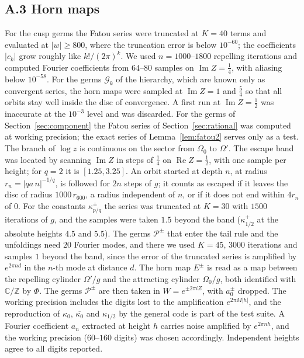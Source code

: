 \documentclass[11pt]{amsart}
\theoremstyle{definition}
\theoremstyle{remark}
\newcommand{\C}{\mathbb{C}}
\newcommand{\Z}{\mathbb{Z}}
\newcommand{\cG}{\mathcal{G}}
\begin{document}
\subsection*{A.3 Horn maps}
For the cusp germs the Fatou series were truncated at $K=40$ terms and evaluated at $|w|\ge800$, where the truncation error is below $10^{-60}$; the coefficients $|c_k|$ grow roughly like $k!/(2\pi)^k$. We used $n=1000$--$1800$ repelling iterations and computed Fourier coefficients from $64$--$80$ samples on $\operatorname{Im}Z=\frac14$, with aliasing below $10^{-58}$. For the germs $\cG_k$ of the hierarchy, which are known only as convergent series, the horn maps were sampled at $\operatorname{Im}Z=1$ and $\frac54$ so that all orbits stay well inside the disc of convergence. A first run at $\operatorname{Im}Z=\frac12$ was inaccurate at the $10^{-3}$ level and was discarded. For the germs of Section~\ref{sec:component} the Fatou series of Section~\ref{sec:rational} was computed at working precision; the exact series of Lemma~\ref{lem:fatou2} serves only as a test. The branch of $\log z$ is continuous on the sector from $\Omega_0$ to $\Omega'$. The escape band was located by scanning $\operatorname{Im}Z$ in steps of $\frac14$ on $\operatorname{Re}Z=\frac12$, with one sample per height; for $q=2$ it is $[1.25,3.25]$. An orbit started at depth $n$, at radius $r_n=|qa\,n|^{-1/q}$, is followed for $2n$ steps of $g$; it counts as escaped if it leaves the disc of radius $1000\,r_{600}$, a radius independent of $n$, or if it does not end within $4r_n$ of $0$. For the constants $\kappa^\pm_{p/q}$ the series was truncated at $K=30$ with $1500$ iterations of $g$, and the samples were taken $1.5$ beyond the band ($\kappa^+_{1/2}$ at the absolute heights $4.5$ and $5.5$). The germs $\mathcal P^\pm$ that enter the tail rule and the unfoldings need $20$ Fourier modes, and there we used $K=45$, $3000$ iterations and samples $1$ beyond the band, since the error of the truncated series is amplified by $e^{2\pi nd}$ in the $n$-th mode at distance $d$. The horn map $E^\pm$ is read as a map between the repelling cylinder $\Omega'/g$ and the attracting cylinder $\Omega_0/g$, both identified with $\C/\Z$ by $\Phi$. The germs $\mathcal P^\pm$ are then taken in $W=e^{\pm2\pi iZ}$, with $a^\pm_0$ dropped. The working precision includes the digits lost to the amplification $e^{2\pi M|h|}$, and the reproduction of $\kappa_0$, $\overline{\kappa_0}$ and $\kappa_{1/2}$ by the general code is part of the test suite. A Fourier coefficient $a_n$ extracted at height $h$ carries noise amplified by $e^{2\pi nh}$, and the working precision ($60$--$160$ digits) was chosen accordingly. Independent heights agree to all digits reported.
\end{document}
